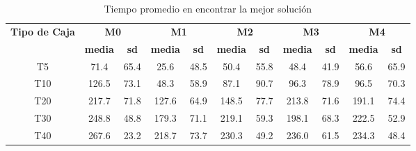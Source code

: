 \begin{table}[H]
    \centering
    \caption{Tiempo promedio en encontrar la mejor solución}
    \label{tab:tiempo}
    \begin{tabular}{|c|c|c|c|c|c|c|c|c|c|c|}
        \hline
        \multirow{2}{*}{\textbf{Tipo de Caja}} & \multicolumn{2}{c|}{\textbf{M0}} & \multicolumn{2}{c|}{\textbf{M1}} & \multicolumn{2}{c|}{\textbf{M2}} & \multicolumn{2}{c|}{\textbf{M3}} & \multicolumn{2}{c|}{\textbf{M4}}                                                                             \\ \cline{2-11}
                                               & \textbf{media}                   & \textbf{sd}                      & \textbf{media}                   & \textbf{sd}                      & \textbf{media}                   & \textbf{sd} & \textbf{media} & \textbf{sd} & \textbf{media} & \textbf{sd} \\ \hline
        T5                                     & 71.4                             & 65.4                             & 25.6                             & 48.5                             & 50.4                             & 55.8        & 48.4           & 41.9        & 56.6           & 65.9        \\ \hline
        T10                                    & 126.5                            & 73.1                             & 48.3                             & 58.9                             & 87.1                             & 90.7        & 96.3           & 78.9        & 96.5           & 70.3        \\ \hline
        T20                                    & 217.7                            & 71.8                             & 127.6                            & 64.9                             & 148.5                            & 77.7        & 213.8          & 71.6        & 191.1          & 74.4        \\ \hline
        T30                                    & 248.8                            & 48.8                             & 179.3                            & 71.1                             & 219.1                            & 59.3        & 198.1          & 68.3        & 222.5          & 52.9        \\ \hline
        T40                                    & 267.6                            & 23.2                             & 218.7                            & 73.7                             & 230.3                            & 49.2        & 236.0          & 61.5        & 234.3          & 48.4        \\ \hline
    \end{tabular}
\end{table}

